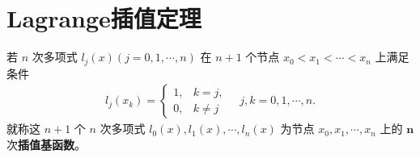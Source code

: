 \documentclass[../../main.tex]{subfiles}%
\begin{document}
\section{Lagrange插值定理}

\begin{definition}[插值基函数]
若 $n$ 次多项式 $l_j(x) (j = 0, 1, \cdots, n)$ 在 $n + 1$ 个节点 $x_0 < x_1 < \cdots < x_n$ 上满足条件 
\begin{align*}
l_j(x_k) = \begin{cases} 
1, & k = j, \\ 
0, & k \neq j 
\end{cases} \quad j, k = 0, 1, \cdots, n.
\end{align*}
就称这 $n + 1$ 个 $n$ 次多项式 $l_0(x), l_1(x), \cdots, l_n(x)$ 为节点 $x_0, x_1, \cdots, x_n$ 上的 $\boldsymbol{n}$ 次\textbf{插值基函数}。
\end{definition}
\end{document}
